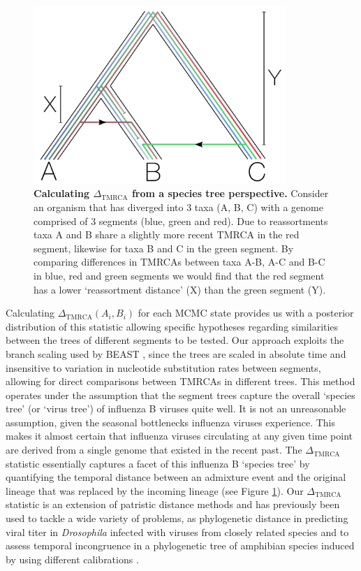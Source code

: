 \documentclass[11pt,oneside,letterpaper]{article}
\newcommand{\dtmrca}{\Delta_\mathrm{TMRCA}}
\begin{document}
\begin{figure}[h]
	\centering	
	\includegraphics[width=0.85\textwidth]{figures/InfB_methodSpeciesTree.pdf}
	\caption{\textbf{Calculating $\dtmrca$ from a species tree perspective.}
Consider an organism that has diverged into 3 taxa (A, B, C) with a genome comprised of 3 segments (blue, green and red).
Due to reassortments taxa A and B share a slightly more recent TMRCA in the red segment, likewise for taxa B and C in the green segment.
By comparing differences in TMRCAs between taxa A-B, A-C and B-C in blue, red and green segments we would find that the red segment has a lower `reassortment distance' (X) than the green segment (Y).
}
	\label{speciesTree}
\end{figure}

Calculating $\dtmrca(A_i, B_i)$ for each MCMC state provides us with a posterior distribution of this statistic allowing  specific hypotheses regarding similarities between the trees of different segments to be tested.
Our approach exploits the branch scaling used by BEAST \citep{drummond2012}, since the trees are scaled in absolute time and insensitive to variation in nucleotide substitution rates between segments, allowing for direct comparisons between TMRCAs in different trees.
This method operates under the assumption that the segment trees capture the overall `species tree' (or `virus tree') of influenza B viruses quite well.
It is not an unreasonable assumption, given the seasonal bottlenecks influenza viruses experience.
This makes it almost certain that influenza viruses circulating at any given time point are derived from a single genome that existed in the recent past.
The $\dtmrca$ statistic essentially captures a facet of this influenza B `species tree' by quantifying the temporal distance between an admixture event and the original lineage that was replaced by the incoming lineage (see Figure \ref{speciesTree}).
Our $\dtmrca$ statistic is an extension of patristic distance methods and has previously been used to tackle a wide variety of problems, as phylogenetic distance in predicting viral titer in \textit{Drosophila} infected with viruses from closely related species \citep{longdon2011} and to assess temporal incongruence in a phylogenetic tree of amphibian species induced by using different calibrations \citep{ruane2011}.
\end{document}
